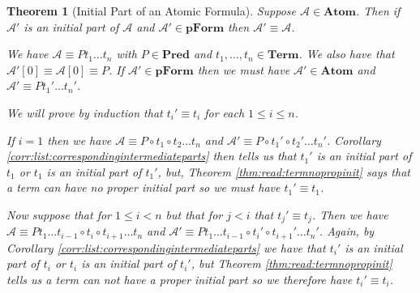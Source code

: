\documentclass[12pt]{article}
\theoremstyle{break}
\theoremstyle{break}
\newtheorem{theorem}{Theorem}[section]
\theoremstyle{break}
\theoremstyle{break}
\theoremstyle{break}
\newtheorem{informal definition}[definition]{Informal Definition}
\newcommand{\mc}[1]{\mathcal{#1}}
\begin{document}
\begin{theorem}[Initial Part of an Atomic Formula]
\label{thm:read:initpartatom}
Suppose $\mc{A}\in\textbf{Atom}$.
Then if $\mc{A}'$ is an initial part of $\mc{A}$ and $\mc{A}'\in\textbf{pForm}$ then $\mc{A}' \equiv \mc{A}$.

We have $\mc{A} \equiv Pt_1\ldots t_n$ with $P\in \textbf{Pred}$ and $t_1,\ldots, t_n\in\textbf{Term}$.
We also have that $\mc{A}'[0] \equiv \mc{A}[0] \equiv P$.
If $\mc{A}'\in\textbf{pForm}$ then we must have $\mc{A}'\in\textbf{Atom}$ and $\mc{A}' \equiv Pt_1'\ldots t_n'$.

We will prove by induction that $t_i' \equiv t_i$ for each $1\le i \le n$.

If $i=1$ then we have $\mc{A} \equiv P \circ t_1 \circ t_2\ldots t_n$ and $\mc{A}' \equiv P \circ t_1' \circ t_2'\ldots t_n'$.
Corollary \ref{corr:list:correspondingintermediateparts} then tells us that $t_1'$ is an initial part of $t_1$ or $t_1$ is an initial part of $t_1'$, but, Theorem \ref{thm:read:termnopropinit} says that a term can have no proper initial part so we must have $t_1'\equiv t_1$.

Now suppose that for $1 \le i < n$ but that for $j < i$ that $t_j' \equiv t_j$.
Then we have $\mc{A}\equiv P t_1\ldots t_{i-1} \circ t_i \circ t_{i+1} \ldots t_n$ and $\mc{A}' \equiv P t_1 \ldots t_{i-1} \circ t_i' \circ t_{i+1}' \ldots t_n'$.
Again, by Corollary \ref{corr:list:correspondingintermediateparts} we have that $t_i'$ is an initial part of $t_i$ or $t_i$ is an initial part of $t_i'$, but Theorem \ref{thm:read:termnopropinit} tells us a term can not have a proper initial part so we therefore have $t_i' \equiv t_i$.
\end{theorem}
\end{document}
